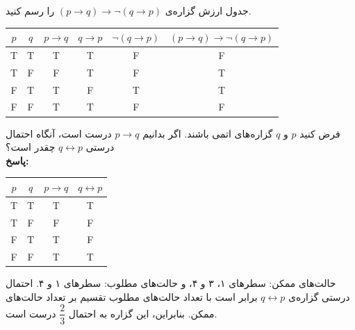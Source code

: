 \begin{example}
	جدول ارزش گزاره‌ی
	$(p \rightarrow q) \rightarrow \neg(q \rightarrow p)$
	را رسم کنید.
	\begin{table}[H]
		\centering
		\begin{latin}
			\begin{tabular}{c|c|c|c|c|c}
				$p$ & $q$ & $p \rightarrow q$ & $q \rightarrow p$ & $\neg(q \rightarrow p)$ & $(p \rightarrow q) \rightarrow \neg(q \rightarrow p)$ \\
				\hline
				T & T & T & T & F & F \\
				T & F & F & T & F & T \\
				F & T & T & F & T & T \\
				F & F & T & T & F & F \\
			\end{tabular}
		\end{latin}
	\end{table}
\end{example}

\begin{example}
	فرض کنید $p$ و $q$ گزاره‌های اتمی باشند. اگر بدانیم
	$p \rightarrow q$
	درست است، آنگاه احتمال درستی
	$q \leftrightarrow p$
	چقدر است؟
	\\ \textbf{پاسخ:}
	\begin{table}[H]
		\centering
		\begin{latin}
			\begin{tabular}{c|c|c|c}
				$p$ & $q$ & $p \rightarrow q$ & $q \leftrightarrow p$ \\
				\hline
				T & T & T & T \\
				T & F & F & F \\
				F & T & T & F \\
				F & F & T & T
			\end{tabular}
		\end{latin}
	\end{table}
	\noindent
	حالت‌های ممکن: سطرهای ۱، ۳ و ۴، و حالت‌های مطلوب: سطرهای ۱ و ۴. احتمال درستی گزاره‌ی
	$q \leftrightarrow p$
	برابر است با تعداد حالت‌های مطلوب تقسیم بر تعداد حالت‌های ممکن. بنابراین، این گزاره به احتمال
	$\dfrac{2}{3}$
	درست است.
\end{example}

